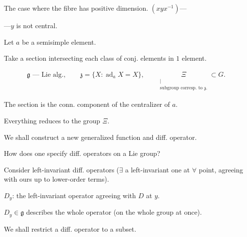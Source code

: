 The case where the fibre has positive dimension. $(xyx^{-1})$—

—$y$ is not central.



Let $a$ be a semisimple element.

Take a section intersecting each class of conj. elements in $1$ element.



\begin{gather*}
\mathfrak g\text{ — Lie alg.},\qquad
\mathfrak z=\{X:\operatorname{ad}_a X=X\},\qquad
\underset{\substack{\vert\\\text{subgroup corresp. to }\mathfrak z.}}{\Xi}\subset G.
\end{gather*}



The section is the conn. component of the centralizer of $a$.

Everything reduces to the group $\Xi$.



We shall construct a new generalized function and diff. operator.



How does one specify diff. operators on a Lie group?

Consider left-invariant diff. operators ($\exists$ a left-invariant one at $\forall$ point,
agreeing with ours up to lower-order terms).



$D_y$: the left-invariant operator agreeing with $D$ at $y$.



$D_y\in\mathfrak g$ describes the whole operator (on the whole group at once).



We shall restrict a diff. operator to a subset.








